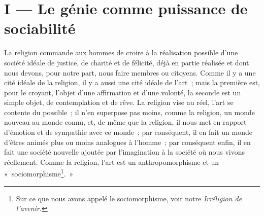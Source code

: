 \documentclass[french,twoside]{book} %
\begin{document}
\section[{I — Le génie comme puissance de sociabilité}]{I — Le génie comme puissance de sociabilité}
\noindent La religion commande aux hommes de croire à la réalisation possible d’une société idéale de justice, de charité et de félicité, déjà en partie réalisée et dont nous devons, pour notre part, nous faire membres ou citoyens. Comme il y a une cité idéale de la religion, il y a aussi une cité idéale de l’art ; mais la première est, pour le croyant, l’objet d’une affirmation et d’une volonté, la seconde est un simple objet, de contemplation et de rêve. La religion vise au réel, l’art se contente du possible ; il n’en superpose pas moins, comme la religion, un monde nouveau au monde connu, et, de même que la religion, il nous met en rapport d’émotion et de sympathie avec ce monde ; par conséquent, il en fait un monde d’êtres animés plus ou moins analogues à l’homme ; par conséquent enfin, il en fait une société nouvelle ajoutée par l’imagination à la société où nous vivons réellement. Comme la religion, l’art est un anthropomorphisme et un « sociomorphisme\footnote{ Sur ce que nous avons appelé le sociomorphisme, voir notre \emph{Irréligion de l’avenir.}}. »\par
\end{document}
